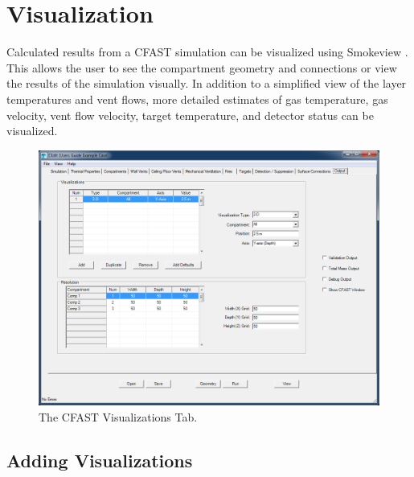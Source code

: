 \chapter{Visualization}

Calculated results from a CFAST simulation can be visualized using Smokeview \cite{Smokeview_Users_Guide_6}. This allows the user to see the compartment geometry and connections or view the results of the simulation visually. In addition to a simplified view of the layer temperatures and vent flows, more detailed estimates of gas temperature, gas velocity, vent flow velocity, target temperature, and detector status can be visualized.

\begin{figure}[h!]
\begin{center}
\includegraphics[width=6.5in]{FIGURES/Visualizations_Tab}
\caption[The CFAST Visualizations Tab]{The CFAST Visualizations Tab.}
\end{center}
\end{figure}

\section{Adding Visualizations}

